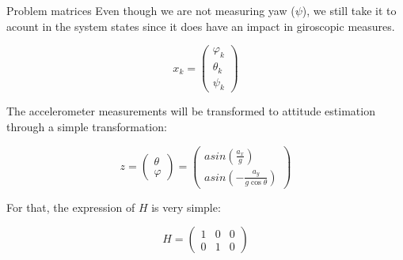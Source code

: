 \begin{frame}{Problem matrices}
Even though we are not measuring yaw ($\psi$), we still take it to acount in the system states since it does have an impact in giroscopic measures.

\begin{equation}
    x_k = 
        \begin{pmatrix}
            \varphi_k \\
            \theta_k \\
            \psi_k
        \end{pmatrix}
\end{equation}

The accelerometer measurements will be transformed to attitude estimation through a simple transformation:

\begin{equation}
    z =
    \begin{pmatrix}
        \theta\\
        \varphi
    \end{pmatrix}
    = 
    \begin{pmatrix}
        asin \left( \frac{a_x}{g} \right) \\
        asin \left( -\frac{a_y}{g \cos \theta} \right)
    \end{pmatrix}
\end{equation}

For that, the expression of $H$ is very simple:

\begin{equation}
H =
\begin{pmatrix}
1 & 0 & 0 \\
0 & 1 & 0
\end{pmatrix}
\end{equation}

\end{frame}

